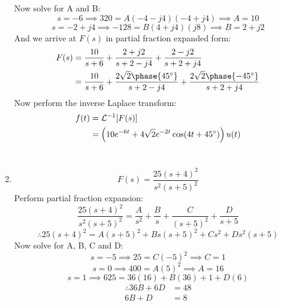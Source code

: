 \begin{enumerate}
{\begin{equation*}
		\end{equation*}
		Now solve for A and B:
		\begin{equation*}
			s = -6 \implies 320 = A(-4-j4)(-4+j4) \implies A = 10
		\end{equation*}
		\begin{equation*}
			s = -2+j4 \implies -128 = B(4+j4)(j8) \implies B = 2 + j2
		\end{equation*}
		And we arrive at $F(s)$ in partial fraction expanded form:
		\begin{align*}
			F(s) &= \frac{10}{s+6} + \frac{2+j2}{s+2-j4} + \frac{2-j2}{s+2+j4} \\
			&= \frac{10}{s+6} + \frac{2\sqrt{2} \phase{45 \degree}}{s+2-j4} + \frac{2\sqrt{2} \phase{-45 \degree}}{s+2+j4}
		\end{align*}
		Now perform the inverse Laplace transform:
		\begin{align*}
			f(t) &= \mathcal{L}^{-1}[F(s)] \\
			&= \left(10e^{-6t} + 4\sqrt{2}e^{-2t} \cos(4t + 45 \degree) \right) u(t)
		\end{align*}
		\\
	}
	\item{
		\begin{equation*}
			F(s) = \frac{25(s+4)^2}{s^2(s+5)^2}
		\end{equation*}
		Perform partial fraction expansion:
		\begin{equation*}
			\frac{25(s+4)^2}{s^2(s+5)^2} = \frac{A}{s^2} + \frac{B}{s} + \frac{C}{(s+5)^2} + \frac{D}{s+5}
		\end{equation*}
		\begin{equation*}
			\therefore 25(s+4)^2 = A(s+5)^2 + Bs(s+5)^2 + Cs^2 + Ds^2(s+5)
		\end{equation*}
		Now solve for A, B, C and D:
		\begin{equation*}
			s = -5 \implies 25 = C(-5)^2 \implies C = 1
		\end{equation*}
		\begin{equation*}
			s = 0 \implies 400 = A(5)^2 \implies A = 16
		\end{equation*}
		\begin{equation*}
			s = 1 \implies 625 = 36(16) + B(36) + 1 + D(6)
		\end{equation*}
		\begin{align}
			\therefore 36B + 6D &= 48 \nonumber \\
			6B + D &= 8
		\end{align}
		\begin{equation*}

\end{equation*}}
\end{enumerate}
